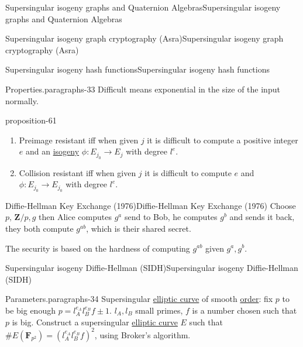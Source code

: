 \documentclass[10pt,]{book}
\numberwithin{equation}{section}
\newcommand{\ZZ}{\mathbf{Z}}
\newcommand{\FF}{\mathbf{F}}
\begin{document}
\begin{chapterptx}{Supersingular isogeny graphs and Quaternion Algebras}{}{Supersingular isogeny graphs and Quaternion Algebras}{}{}
\begin{sectionptx}{Supersingular isogeny graph cryptography (Asra)}{}{Supersingular isogeny graph cryptography (Asra)}{}{}
\begin{subsectionptx}{Supersingular isogeny hash functions}{}{Supersingular isogeny hash functions}{}{}
\begin{paragraphs}{Properties.}{paragraphs-33}
\hypertarget{p-837}{}%
Difficult means exponential in the size of the input normally.%
\begin{proposition}{}{}{proposition-61}%
\hypertarget{p-838}{}%
\leavevmode%
\begin{enumerate}
\item\hypertarget{li-210}{}Preimage resistant iff when given \(j\) it is difficult to compute a positive integer \(e\) and an \hyperref[def-supersing-isog-isog]{isogeny} \(\phi\colon E_{j_0} \to E_j\) with degree \(l^e\).%
\item\hypertarget{li-211}{}Collision resistant iff when given \(j\) it is difficult to compute \(e\) and  \(\phi \colon E_{j_0} \to E_{j_0}\) with degree \(l^e\).%
\end{enumerate}
%
\end{proposition}
\end{paragraphs}%
\end{subsectionptx}
%
%
\typeout{************************************************}
\typeout{************************************************}
%
\begin{subsectionptx}{Diffie-Hellman Key Exchange (1976)}{}{Diffie-Hellman Key Exchange (1976)}{}{}\label{subsection-70}
\hypertarget{p-839}{}%
Choose \(p,\, \ZZ/p, g\) then Alice computes \(g^a\) send to Bob, he computes \(g^b\) and sends it back, they both compute \(g^{ab}\), which is their shared secret.%
\par
\hypertarget{p-840}{}%
The security is based on the hardness of computing \(g^{ab}\) given \(g^a,g^b\).%
\end{subsectionptx}
%
%
\typeout{************************************************}
\typeout{************************************************}
%
\begin{subsectionptx}{Supersingular isogeny Diffie-Hellman (SIDH)}{}{Supersingular isogeny Diffie-Hellman (SIDH)}{}{}\label{subsection-71}
\begin{paragraphs}{Parameters.}{paragraphs-34}%
\hypertarget{p-841}{}%
Supersingular \hyperref[def-supersing-isog-ec]{elliptic curve} of smooth \hyperref[def-order-quaternion]{order}: fix \(p\) to be big enough \(p = l_A^{e_A} l_B^{e_B} f  \pm 1\). \(l_A,l_B\) small primes, \(f\) is a number chosen such that \(p\) is big. Construct a supersingular \hyperref[def-supersing-isog-ec]{elliptic curve} \(E\) such that \(\# E(\FF_{p^2}) = (l_A^{e_A}l_B^{e_B} f)^2\), using Broker's algorithm.%

\end{paragraphs}
\end{subsectionptx}
\end{sectionptx}
\end{chapterptx}
\end{document}
